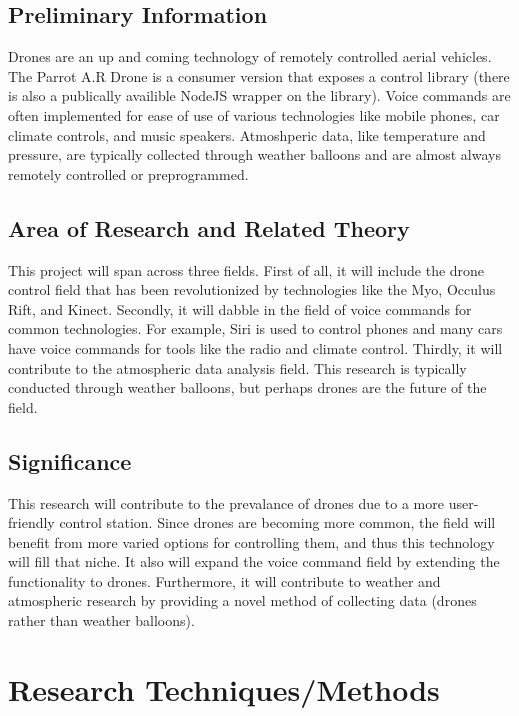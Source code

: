 \documentclass{article}
\begin{document}
	\subsection{Preliminary Information}
	Drones are an up and coming technology of remotely controlled aerial vehicles. The Parrot A.R Drone is a consumer version that exposes a control library (there is also a publically availible NodeJS wrapper on the library). Voice commands are often implemented for ease of use of various technologies like mobile phones, car climate controls, and music speakers. Atmoshperic data, like temperature and pressure, are typically collected through weather balloons and are almost always remotely controlled or preprogrammed. 
	\subsection{Area of Research and Related Theory}
	This project will span across three fields. First of all, it will include the drone control field that has been revolutionized by technologies like the Myo, Occulus Rift, and Kinect. Secondly, it will dabble in the field of voice commands for common technologies. For example, Siri is used to control phones and many cars have voice commands for tools like the radio and climate control. Thirdly, it will contribute to the atmospheric data analysis field. This research is typically conducted through weather balloons, but perhaps drones are the future of the field. 
	\subsection{Significance}
	This research will contribute to the prevalance of drones due to a more user-friendly control station. Since drones are becoming more common, the field will benefit from more varied options for controlling them, and thus this technology will fill that niche. It also will expand the voice command field by extending the functionality to drones. Furthermore, it will contribute to weather and atmospheric research by providing a novel method of collecting data (drones rather than weather balloons). 


	\section{Research Techniques/Methods}
\end{document}
